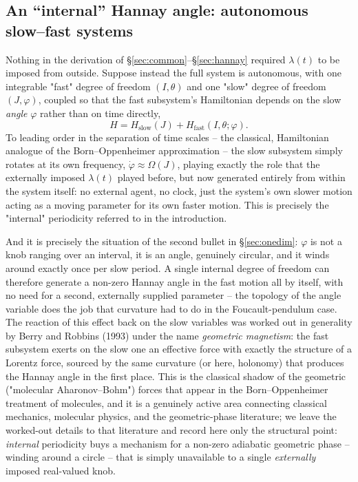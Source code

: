 \documentclass[11pt]{book}
\begin{document}
\subsection{An ``internal'' Hannay angle: autonomous slow--fast systems}
\label{sec:internal}

Nothing in the derivation of \S\ref{sec:common}--\S\ref{sec:hannay} required $\lambda(t)$ to be
imposed from outside. Suppose instead the full system is autonomous, with one integrable "fast"
degree of freedom $(I,\theta)$ and one "slow" degree of freedom $(J,\varphi)$, coupled so that the
fast subsystem's Hamiltonian depends on the slow \emph{angle} $\varphi$ rather than on time
directly,
\begin{equation}
H = H_{\text{slow}}(J) + H_{\text{fast}}(I,\theta;\varphi).
\end{equation}
To leading order in the separation of time scales -- the classical, Hamiltonian analogue of the
Born--Oppenheimer approximation -- the slow subsystem simply rotates at its own frequency,
$\dot\varphi \approx \Omega(J)$, playing exactly the role that the externally imposed $\lambda(t)$
played before, but now generated entirely from within the system itself: no external agent, no
clock, just the system's own slower motion acting as a moving parameter for its own faster motion.
This is precisely the "internal" periodicity referred to in the introduction.

And it is precisely the situation of the second bullet in \S\ref{sec:onedim}: $\varphi$ is not a
knob ranging over an interval, it is an angle, genuinely circular, and it winds around exactly once
per slow period. A single internal degree of freedom can therefore generate a non-zero Hannay angle
in the fast motion all by itself, with no need for a second, externally supplied parameter -- the
topology of the angle variable does the job that curvature had to do in the Foucault-pendulum case.
The reaction of this effect back on the slow variables was worked out in generality by Berry and
Robbins (1993) under the name \emph{geometric magnetism}: the fast subsystem exerts on the slow one
an effective force with exactly the structure of a Lorentz force, sourced by the same curvature (or
here, holonomy) that produces the Hannay angle in the first place. This is the classical shadow of
the geometric ("molecular Aharonov--Bohm") forces that appear in the Born--Oppenheimer treatment of
molecules, and it is a genuinely active area connecting classical mechanics, molecular physics, and
the geometric-phase literature; we leave the worked-out details to that literature and record here
only the structural point: \emph{internal} periodicity buys a mechanism for a non-zero adiabatic
geometric phase -- winding around a circle -- that is simply unavailable to a single
\emph{externally} imposed real-valued knob.
\end{document}
